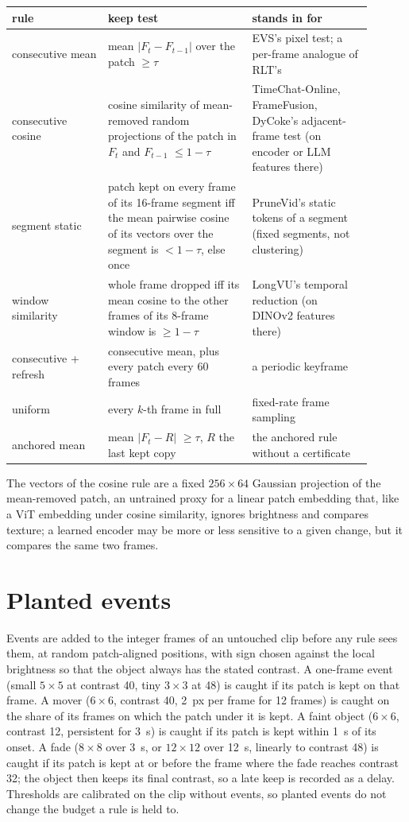 \begin{center}\small
\begin{tabular}{p{0.24\linewidth}p{0.36\linewidth}p{0.3\linewidth}}
\toprule
rule & keep test & stands in for \\
\midrule
consecutive mean & mean $|F_t - F_{t-1}|$ over the patch $\ge \tau$ & EVS's pixel test; a per-frame analogue of RLT's \\
consecutive cosine & cosine similarity of mean-removed random projections of the patch in $F_t$ and $F_{t-1}$ $\le 1 - \tau$ & TimeChat-Online, FrameFusion, DyCoke's adjacent-frame test (on encoder or LLM features there) \\
segment static & patch kept on every frame of its 16-frame segment iff the mean pairwise cosine of its vectors over the segment is $< 1 - \tau$, else once & PruneVid's static tokens of a segment (fixed segments, not clustering) \\
window similarity & whole frame dropped iff its mean cosine to the other frames of its 8-frame window is $\ge 1 - \tau$ & LongVU's temporal reduction (on DINOv2 features there) \\
consecutive + refresh & consecutive mean, plus every patch every 60 frames & a periodic keyframe \\
uniform & every $k$-th frame in full & fixed-rate frame sampling \\
anchored mean & mean $|F_t - R|$ $\ge \tau$, $R$ the last kept copy & the anchored rule without a certificate \\
\bottomrule
\end{tabular}
\end{center}

The vectors of the cosine rule are a fixed $256 \times 64$ Gaussian projection of the mean-removed patch, an untrained proxy for a linear patch embedding that, like a ViT embedding under cosine similarity, ignores brightness and compares texture; a learned encoder may be more or less sensitive to a given change, but it compares the same two frames.

\section{Planted events}
\label{app:events}

Events are added to the integer frames of an untouched clip before any rule sees them, at random patch-aligned positions, with sign chosen against the local brightness so that the object always has the stated contrast. A one-frame event (small $5{\times}5$ at contrast 40, tiny $3{\times}3$ at 48) is caught if its patch is kept on that frame. A mover ($6{\times}6$, contrast 40, 2~px per frame for 12 frames) is caught on the share of its frames on which the patch under it is kept. A faint object ($6{\times}6$, contrast 12, persistent for 3~s) is caught if its patch is kept within 1~s of its onset. A fade ($8{\times}8$ over 3~s, or $12{\times}12$ over 12~s, linearly to contrast 48) is caught if its patch is kept at or before the frame where the fade reaches contrast 32; the object then keeps its final contrast, so a late keep is recorded as a delay. Thresholds are calibrated on the clip without events, so planted events do not change the budget a rule is held to.

